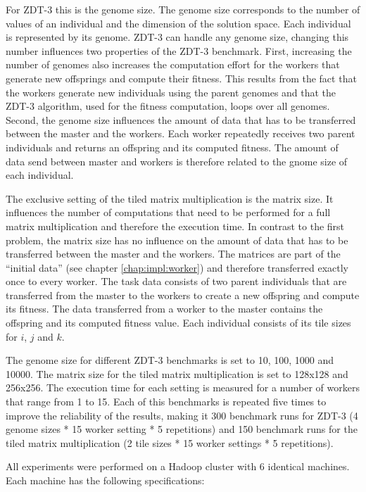 For ZDT-3 this is the genome size. The genome size corresponds to the number of values of an individual and the dimension of the solution space. Each individual is represented by its genome. ZDT-3 can handle any genome size, changing this number influences two properties of the ZDT-3 benchmark. First, increasing the number of genomes also increases the computation effort for the workers that generate new offsprings and compute their fitness. This results from the fact that the workers generate new individuals using the parent genomes and that the ZDT-3 algorithm, used for the fitness computation, loops over all genomes. Second, the genome size influences the amount of data that has to be transferred between the master and the workers. Each worker repeatedly receives two parent individuals and returns an offspring and its computed fitness. The amount of data send between master and workers is therefore related to the gnome size of each individual.

The exclusive setting of the tiled matrix multiplication is the matrix size. It influences the number of computations that need to be performed for a full matrix multiplication and therefore the execution time. In contrast to the first problem, the matrix size has no influence on the amount of data that has to be transferred between the master and the workers. The matrices are part of the ``initial data'' (see chapter \ref{chap:impl:worker}) and therefore transferred exactly once to every worker. The task data consists of two parent individuals that are transferred from the master to the workers to create a new offspring and compute its fitness. The data transferred from a worker to the master contains the offspring and its computed fitness value. Each individual consists of its tile sizes for $i$, $j$ and $k$.

The genome size for different ZDT-3 benchmarks is set to 10, 100, 1000 and 10000. The matrix size for the tiled matrix multiplication is set to 128x128 and 256x256. The execution time for each setting is measured for a number of workers that range from 1 to 15. Each of this benchmarks is repeated five times to improve the reliability of the results, making it 300 benchmark runs for ZDT-3 (4 genome sizes * 15 worker setting * 5 repetitions) and 150 benchmark runs for the tiled matrix multiplication (2 tile sizes * 15 worker settings * 5 repetitions).

All experiments were performed on a Hadoop cluster with 6 identical machines. Each machine has the following specifications:

